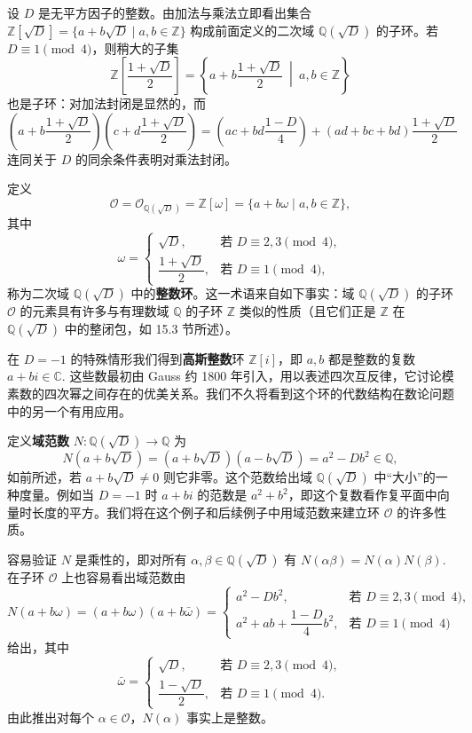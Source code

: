 \begin{example}[二次整数环]
设 \(D\) 是无平方因子的整数。由加法与乘法立即看出集合 \(\mathbb{Z}[\sqrt{D}] = \{a + b\sqrt{D} \mid a, b \in \mathbb{Z}\}\) 构成前面定义的二次域 \(\mathbb{Q}(\sqrt{D})\) 的子环。若 \(D \equiv 1 \pmod 4\)，则稍大的子集
\[
\mathbb{Z}\left[\frac{1+\sqrt{D}}{2}\right] = \left\{a + b\frac{1+\sqrt{D}}{2} \ \middle|\ a, b \in \mathbb{Z}\right\}
\]
也是子环：对加法封闭是显然的，而
\[
\left(a + b\frac{1+\sqrt{D}}{2}\right)\left(c + d\frac{1+\sqrt{D}}{2}\right) = \left(ac + bd\frac{1-D}{4}\right) + \left(ad + bc + bd\right)\frac{1+\sqrt{D}}{2}
\]
连同关于 \(D\) 的同余条件表明对乘法封闭。

定义
\[
\mathcal{O} = \mathcal{O}_{\mathbb{Q}(\sqrt{D})} = \mathbb{Z}[\omega] = \{a + b\omega \mid a, b \in \mathbb{Z}\},
\]
其中
\[
\omega = \begin{cases} \sqrt{D}, & \text{若 } D \equiv 2, 3 \pmod 4, \\ \dfrac{1+\sqrt{D}}{2}, & \text{若 } D \equiv 1 \pmod 4, \end{cases}
\]
称为二次域 \(\mathbb{Q}(\sqrt{D})\) 中的\textbf{整数环}。这一术语来自如下事实：域 \(\mathbb{Q}(\sqrt{D})\) 的子环 \(\mathcal{O}\) 的元素具有许多与有理数域 \(\mathbb{Q}\) 的子环 \(\mathbb{Z}\) 类似的性质（且它们正是 \(\mathbb{Z}\) 在 \(\mathbb{Q}(\sqrt{D})\) 中的整闭包，如 15.3 节所述）。

在 \(D = -1\) 的特殊情形我们得到\textbf{高斯整数}环 \(\mathbb{Z}[i]\)，即 \(a, b\) 都是整数的复数 \(a+bi \in \mathbb{C}\). 这些数最初由 Gauss 约 1800 年引入，用以表述四次互反律，它讨论模素数的四次幂之间存在的优美关系。我们不久将看到这个环的代数结构在数论问题中的另一个有用应用。

定义\textbf{域范数} \(N : \mathbb{Q}(\sqrt{D}) \to \mathbb{Q}\) 为
\[
N(a + b\sqrt{D}) = (a+b\sqrt{D})(a-b\sqrt{D}) = a^2 - Db^2 \in \mathbb{Q},
\]
如前所述，若 \(a + b\sqrt{D} \neq 0\) 则它非零。这个范数给出域 \(\mathbb{Q}(\sqrt{D})\) 中“大小”的一种度量。例如当 \(D = -1\) 时 \(a+bi\) 的范数是 \(a^2+b^2\)，即这个复数看作复平面中向量时长度的平方。我们将在这个例子和后续例子中用域范数来建立环 \(\mathcal{O}\) 的许多性质。

容易验证 \(N\) 是乘性的，即对所有 \(\alpha, \beta \in \mathbb{Q}(\sqrt{D})\) 有 \(N(\alpha\beta) = N(\alpha)N(\beta)\). 在子环 \(\mathcal{O}\) 上也容易看出域范数由
\[
N(a + b\omega) = (a + b\omega)(a + b\bar\omega) = \begin{cases} a^2 - Db^2, & \text{若 } D \equiv 2, 3 \pmod 4, \\ a^2 + ab + \dfrac{1-D}{4}b^2, & \text{若 } D \equiv 1 \pmod 4 \end{cases}
\]
给出，其中
\[
\bar\omega = \begin{cases} \sqrt{D}, & \text{若 } D \equiv 2, 3 \pmod 4, \\ \dfrac{1-\sqrt{D}}{2}, & \text{若 } D \equiv 1 \pmod 4. \end{cases}
\]
由此推出对每个 \(\alpha \in \mathcal{O}\)，\(N(\alpha)\) 事实上是整数。


\end{example}
